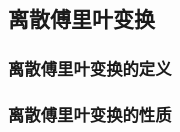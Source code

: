 \subsection{离散傅里叶变换}


\subsubsection{离散傅里叶变换的定义}

\begin{definition}
    
\end{definition}

\subsubsection{离散傅里叶变换的性质}

